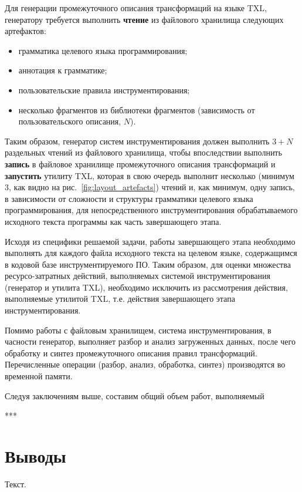 Для генерации промежуточного описания трансформаций на языке TXL, генератору требуется выполнить \textbf{чтение} из файлового хранилища следующих артефактов:
\begin{itemize}[noitemsep]
  \item грамматика целевого языка программирования;
  \item аннотация к грамматике;
  \item пользовательские правила инструментирования;
  \item несколько фрагментов из библиотеки фрагментов (зависимость от пользовательского описания, $N$).
\end{itemize}

Таким образом, генератор систем инструментирования должен выполнить $3 + N$ раздельных чтений из файлового хранилища, чтобы впоследствии выполнить \textbf{запись} в файловое хранилище промежуточного описания трансформаций и \textbf{запустить} утилиту TXL, которая в свою очередь выполнит несколько (минимум $3$, как видно на рис.~\ref{fig:layout_artefacts}) чтений и, как минимум, одну запись, в зависимости от сложности и структуры грамматики целевого языка программирования, для непосредственного инструментирования обрабатываемого исходного текста программы как часть завершающего этапа.

Исходя из специфики решаемой задачи, работы завершающего этапа необходимо выполнять для каждого файла исходного текста на целевом языке, содержащимся в кодовой базе инструментируемого ПО.
Таким образом, для оценки множества ресурсо-затратных действий, выполняемых системой инструментирования (генератор и утилита TXL), необходимо исключить из рассмотрения действия, выполняемые утилитой TXL, т.е. действия завершающего этапа инструментирования.

Помимо работы с файловым хранилищем, система инструментирования, в часности генератор, выполняет разбор и анализ загруженных данных, после чего обработку и синтез промежуточного описания правил трансформаций.
Перечисленные операции (разбор, анализ, обработка, синтез) производятся во временной памяти.

Следуя заключениям выше, составим общий объем работ, выполняемый

***


\section{Выводы}

Текст.
